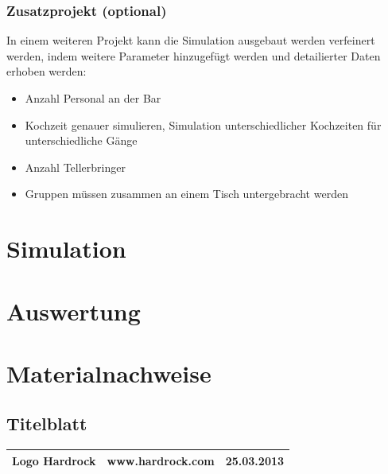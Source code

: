 \documentclass[ngerman,a4paper,12pt]{scrreprt}
\begin{document}
\subsection{Zusatzprojekt (optional)}
In einem weiteren Projekt kann die Simulation ausgebaut werden verfeinert werden, indem weitere Parameter hinzugefügt werden und detailierter Daten erhoben werden:
\begin{itemize}
	\item Anzahl Personal an der Bar
	\item Kochzeit genauer simulieren, Simulation unterschiedlicher Kochzeiten für unterschiedliche Gänge
	\item Anzahl Tellerbringer
	\item Gruppen müssen zusammen an einem Tisch untergebracht werden
\end{itemize}


\chapter{Simulation}


\chapter{Auswertung}


\listoffigures


\chapter{Materialnachweise}
\section{Titelblatt}
\begin{tabularx}{\textwidth}{|Xlr|} %
		\hline
		Logo Hardrock & www.hardrock.com & 25.03.2013 \\
		\hline
\end{tabularx}
\end{document}

